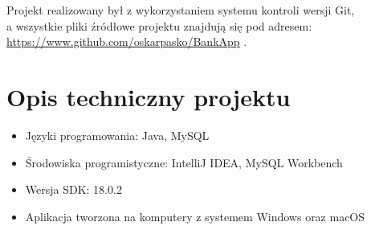 \documentclass[12pt, letterpaper]{article}
\begin{document}
\quad Projekt realizowany był z wykorzystaniem systemu kontroli wersji Git,\\ a wszystkie pliki źródłowe projektu znajdują się pod adresem:\\  \url{https://www.github.com/oskarpasko/BankApp} . 

\section{Opis techniczny projektu}
\begin{itemize}
\item Języki programowania: Java, MySQL
\item Środowiska programistyczne: IntelliJ IDEA, MySQL Workbench
\item Wersja SDK: 18.0.2
\item Aplikacja tworzona na komputery z systemem Windows oraz macOS
\end{itemize}
\end{document}
